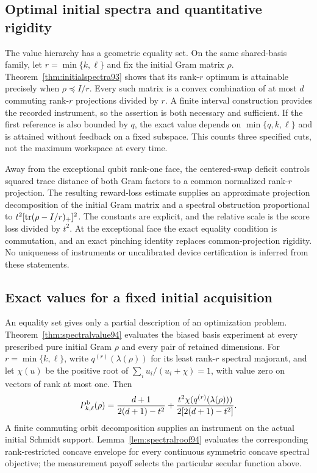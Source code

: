 \subsection{Optimal initial spectra and quantitative rigidity}
The value hierarchy has a geometric equality set.  On the same
shared-basis family, let $r=\min\{k,\ell\}$ and fix the initial
Gram matrix $\rho$.  Theorem~\ref{thm:initialspectra93} shows that
its rank-$r$ optimum is attainable precisely when $\rho\preceq I/r$.
Every such matrix is a convex combination of at most $d$ commuting
rank-$r$ projections divided by $r$.  A finite interval construction
provides the recorded instrument, so the assertion is both necessary
and sufficient.  If the first reference is also bounded by $q$, the
exact value depends on $\min\{q,k,\ell\}$ and is attained without
feedback on a fixed subspace.  This counts three specified cuts,
not the maximum workspace at every time.

Away from the exceptional qubit rank-one face, the centered-swap
deficit controls squared trace distance of both Gram factors to a
common normalized rank-$r$ projection.  The resulting reward-loss
estimate supplies an approximate projection decomposition of the
initial Gram matrix and a spectral obstruction proportional to
$t^2[\operatorname{tr}(\rho-I/r)_+]^2$.  The constants are explicit, and the
relative scale is the score loss divided by $t^2$.
At the exceptional face the exact equality condition is commutation,
and an exact pinching identity replaces common-projection rigidity.
No uniqueness of instruments or uncalibrated device certification is
inferred from these statements.

\subsection{Exact values for a fixed initial acquisition}
An equality set gives only a partial description of an optimization
problem.  Theorem~\ref{thm:spectralvalue94} evaluates the biased basis
experiment at every prescribed pure initial Gram $\rho$ and every
pair of retained dimensions.  For $r=\min\{k,\ell\}$, write
$q^{(r)}(\lambda(\rho))$ for its least rank-$r$ spectral majorant,
and let $\chi(u)$ be the positive root of $\sum_i u_i/(u_i+\chi)=1$,
with value zero on vectors of rank at most one.  Then
\[
 P_{k,\ell}^{\rm b}(\rho)
 =\frac{d+1}{2(d+1)-t^2}
     +\frac{t^2\chi(q^{(r)}(\lambda(\rho)))}{2[2(d+1)-t^2]}.
\]
A finite commuting orbit decomposition supplies an instrument on the
actual initial Schmidt support.  Lemma~\ref{lem:spectralroof94}
evaluates the corresponding rank-restricted concave envelope for every
continuous symmetric concave spectral objective; the measurement payoff
selects the particular secular function above.

